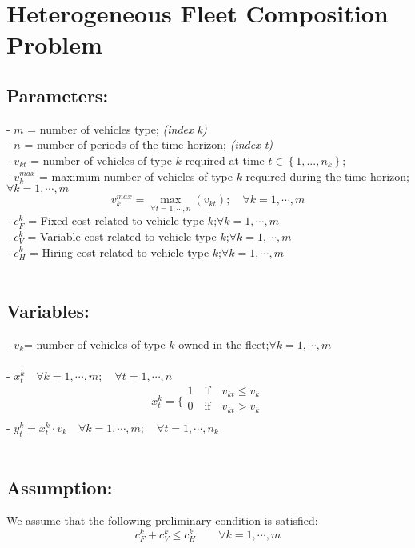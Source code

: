 \documentclass[a4paper,12pt,titlepage]{article}
\begin{document}
\section*{Heterogeneous Fleet Composition Problem}

\subsection*{Parameters:}
- $m$ = number of vehicles type; \textit{(index k)}\\
- $n$ = number of periods of the time horizon; \textit{(index t)}\\
- $v_{kt}$ = number of vehicles of type $k$ required at time $t\in\left\lbrace 1, . . . ,n_k\right\rbrace $;\\
-  $v_{k}^{max}$ = maximum number of vehicles of type $k$ required during the time horizon;\quad$\forall k=1,\cdots,m$\\ 
\begin{equation*}
v_{k}^{max} = \max_{\forall t=1,\cdots,n}(v_{kt});\quad\forall k=1,\cdots,m
\end{equation*}
- $c_F^k$ = Fixed cost related to vehicle type $k$;\quad$\forall k=1,\cdots,m$\\
- $c_V^k$ = Variable cost related to vehicle type $k$;\quad$\forall k=1,\cdots,m$\\
- $c_H^k$ = Hiring cost related to vehicle type $k$;\quad$\forall k=1,\cdots,m$\\
\\
\subsection*{Variables:}
- $v_k$= number of vehicles of type $k$ owned in the fleet;\quad$\forall k=1,\cdots,m$\\
\\
- $x_{t}^k\quad \forall k=1,\cdots,m;\quad\forall t=1,\cdots,n$\\
$$x_t^k=
\bigg \{
\begin{array}{rl}
1\quad \text{if}\quad v_{kt}\leq v_k\\
0\quad \text{if}\quad  v_{kt} > v_k \\
\end{array}
$$
- $y_t^k = x_t^k\cdot v_k\quad \forall k=1,\cdots,m;\quad\forall t=1,\cdots,n_k$\\
\\
\subsection*{Assumption:} We assume that the following preliminary condition is satisfied:
\begin{equation*}
c_F^k+c_V^k\leq c_H^k\qquad \forall k=1,\cdots,m
\end{equation*}
\end{document}
